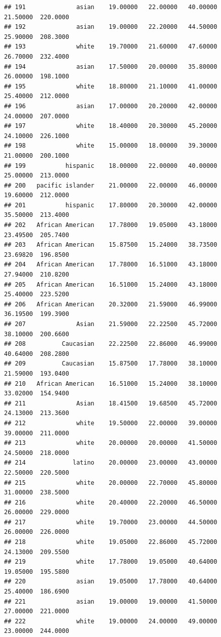 \documentclass[]{article}
\begin{document}
\begin{verbatim}
## 191              asian    19.00000   22.00000   40.00000     21.50000  220.0000
## 192              asian    19.00000   22.20000   44.50000     25.90000  208.3000
## 193              white    19.70000   21.60000   47.60000     26.70000  232.4000
## 194              asian    17.50000   20.00000   35.80000     26.00000  198.1000
## 195              white    18.80000   21.10000   41.00000     25.40000  212.0000
## 196              asian    17.00000   20.20000   42.00000     24.00000  207.0000
## 197              white    18.40000   20.30000   45.20000     24.10000  226.1000
## 198              white    15.00000   18.00000   39.30000     21.00000  200.1000
## 199           hispanic    18.00000   22.00000   40.00000     25.00000  213.0000
## 200   pacific islander    21.00000   22.00000   46.00000     19.60000  212.0000
## 201           hispanic    17.80000   20.30000   42.00000     35.50000  213.4000
## 202   African American    17.78000   19.05000   43.18000     23.49500  205.7400
## 203   African American    15.87500   15.24000   38.73500     23.69820  196.8500
## 204   African American    17.78000   16.51000   43.18000     27.94000  210.8200
## 205   African American    16.51000   15.24000   43.18000     25.40000  223.5200
## 206   African American    20.32000   21.59000   46.99000     36.19500  199.3900
## 207              Asian    21.59000   22.22500   45.72000     38.10000  200.6600
## 208          Caucasian    22.22500   22.86000   46.99000     40.64000  208.2800
## 209          Caucasian    15.87500   17.78000   38.10000     21.59000  193.0400
## 210   African American    16.51000   15.24000   38.10000     33.02000  154.9400
## 211              Asian    18.41500   19.68500   45.72000     24.13000  213.3600
## 212              white    19.50000   22.00000   39.00000     39.00000  211.0000
## 213              white    20.00000   20.00000   41.50000     24.50000  218.0000
## 214             latino    20.00000   23.00000   43.00000     22.50000  220.5000
## 215              white    20.00000   22.70000   45.80000     31.00000  238.5000
## 216              white    20.40000   22.20000   46.50000     26.00000  229.0000
## 217              white    19.70000   23.00000   44.50000     26.00000  226.0000
## 218              white    19.05000   22.86000   45.72000     24.13000  209.5500
## 219              white    17.78000   19.05000   40.64000     19.05000  195.5800
## 220              asian    19.05000   17.78000   40.64000     25.40000  186.6900
## 221              asian    19.00000   19.00000   41.50000     27.00000  221.0000
## 222              white    19.00000   24.00000   49.00000     23.00000  244.0000

\end{verbatim}
\end{document}
